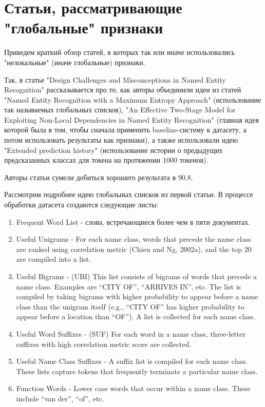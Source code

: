 \section{Статьи, рассматривающие "глобальные" признаки}

Приведем краткий обзор статей, в которых так или иначе использовались "нелокальные" (иначе глобальные) признаки. 

Так, в статье "Design Challenges and Misconceptions in Named Entity Recognition" \cite{ratinov-roth:2009:CoNLL} рассказывается про то, как авторы объединили идеи из статей "Named Entity Recognition with a Maximum Entropy Approach" \cite{Chieu:2003:NER:1119176.1119199} (использование так называемых глобальных списков), "An Effective Two-Stage Model for Exploiting Non-Local Dependencies in Named Entity Recognition" \cite{krishnan-manning:2006:COLACL} (главная идея которой была в том, чтобы сначала применить baseline-систему к датасету, а потом использовать результаты как признаки), а также использовали идею "Extended prediction history" (использование истории о предыдущих предсказанных классах для токена на протяжении 1000 токенов).

Авторы статьи сумели добиться хорошего результата в 90.8. 

\iffalse

Рассмотрим подробнее идею глобальных списков из первой статьи. В процессе обработки датасета создаются следующие листы:
\begin{enumerate}
    \item Frequent Word List - слова, встречающиеся более чем в пяти документах.
    \item Useful Unigrams - For each name class, words that precede the name class are ranked using correlation metric (Chieu and Ng, 2002a), and the top 20 are compiled into a list.
    \item Useful Bigrams - (UBI) This list consists of bigrams of words that precede a name class. Examples are “CITY OF”, “ARRIVES IN”, etc. The list is compiled by taking bigrams with higher probability to appear before a name class than the unigram itself (e.g., “CITY OF” has higher probability to appear before a location than “OF”). A list is collected for each name class.
    \item Useful Word Suffixes - (SUF) For each word in a name class, three-letter suffixes with high correlation metric score are collected.
    \item Useful Name Class Suffixes - A suffix list is compiled for each name class. These lists capture tokens that frequently terminate a particular name class.
    \item Function Words - Lower case words that occur within a name class. These include “van der”, “of”, etc.
\end{enumerate}

